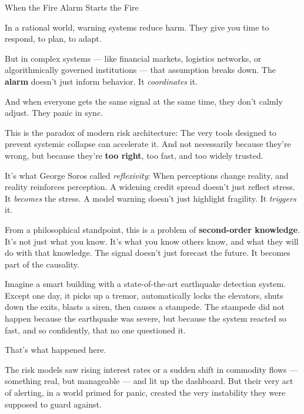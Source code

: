 \begin{PhilosophicalSidebar}{When the Fire Alarm Starts the Fire}

  In a rational world, warning systems reduce harm.  
  They give you time to respond, to plan, to adapt.

  \medskip
  
  But in complex systems — like financial markets, logistics networks, or algorithmically governed institutions — 
  that assumption breaks down.  
  The \textbf{alarm} doesn’t just inform behavior.  
  It \textit{coordinates} it.
  
  \medskip
  
  And when everyone gets the same signal at the same time, they don’t calmly adjust.  
  They panic in sync.
  
  \medskip
  
  This is the paradox of modern risk architecture:  
  The very tools designed to prevent systemic collapse can accelerate it. And not necessarily because they’re 
  wrong, but because they’re \textbf{too right}, too fast, and too widely trusted.

  \medskip
  
  
  It’s what George Soros called \textit{reflexivity}:  
  When perceptions change reality, and reality reinforces perception.  
  A widening credit spread doesn’t just reflect stress. It \textit{becomes} the stress.  
  A model warning doesn’t just highlight fragility. It \textit{triggers} it.
  
  \medskip
  
  From a philosophical standpoint, this is a problem of \textbf{second-order knowledge}.  
  It’s not just what you know. It’s what you know others know, and what they will do with that knowledge.  
  The signal doesn’t just forecast the future. It becomes part of the causality.
  
\end{PhilosophicalSidebar}

  \medskip


Imagine a smart building with a state-of-the-art earthquake detection system. Except one day, it picks up a tremor, 
automatically locks the elevators, shuts down the exits, blasts a siren, then causes a stampede. 
The stampede did not happen because the earthquake 
was severe, but because the system reacted so fast, and so confidently, that no one questioned it.

That’s what happened here.

The risk models saw rising interest rates or a sudden shift in commodity flows — something real, but manageable — and lit up 
the dashboard. But their very act of alerting, in a world primed for panic, created the very instability they were supposed 
to guard against.

